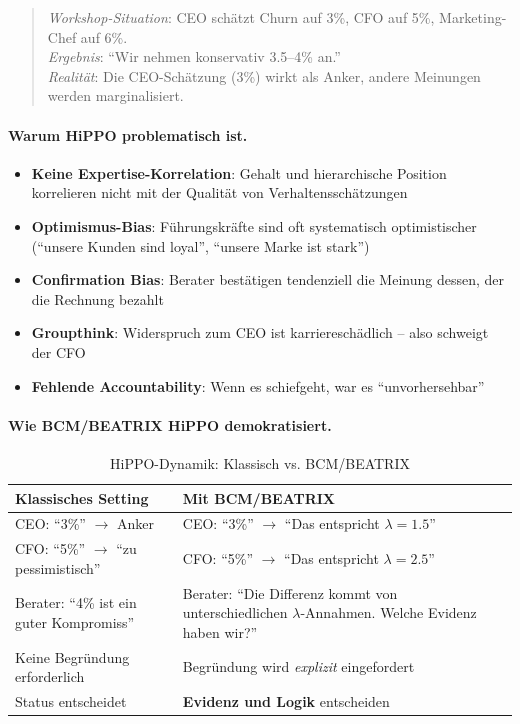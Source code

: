 \begin{quote}
\textit{Workshop-Situation}: CEO schätzt Churn auf 3\%, CFO auf 5\%, Marketing-Chef auf 6\%.\\
\textit{Ergebnis}: ``Wir nehmen konservativ 3.5--4\% an.'' \\
\textit{Realität}: Die CEO-Schätzung (3\%) wirkt als Anker, andere Meinungen werden marginalisiert.
\end{quote}

\paragraph{Warum HiPPO problematisch ist.}
\begin{itemize}
    \item \textbf{Keine Expertise-Korrelation}: Gehalt und hierarchische Position korrelieren nicht mit der Qualität von Verhaltensschätzungen
    \item \textbf{Optimismus-Bias}: Führungskräfte sind oft systematisch optimistischer (``unsere Kunden sind loyal'', ``unsere Marke ist stark'')
    \item \textbf{Confirmation Bias}: Berater bestätigen tendenziell die Meinung dessen, der die Rechnung bezahlt
    \item \textbf{Groupthink}: Widerspruch zum CEO ist karriereschädlich -- also schweigt der CFO
    \item \textbf{Fehlende Accountability}: Wenn es schiefgeht, war es ``unvorhersehbar''
\end{itemize}

\paragraph{Wie BCM/BEATRIX HiPPO demokratisiert.}

\begin{table}[h]
\centering
\caption{HiPPO-Dynamik: Klassisch vs. BCM/BEATRIX}
\begin{tabular}{@{}p{6cm}p{6.5cm}@{}}
\toprule
\textbf{Klassisches Setting} & \textbf{Mit BCM/BEATRIX} \\
\midrule
CEO: ``3\%'' $\rightarrow$ Anker & CEO: ``3\%'' $\rightarrow$ ``Das entspricht $\lambda = 1.5$'' \\[0.3em]
CFO: ``5\%'' $\rightarrow$ ``zu pessimistisch'' & CFO: ``5\%'' $\rightarrow$ ``Das entspricht $\lambda = 2.5$'' \\[0.3em]
Berater: ``4\% ist ein guter Kompromiss'' & Berater: ``Die Differenz kommt von unterschiedlichen $\lambda$-Annahmen. Welche Evidenz haben wir?'' \\[0.3em]
Keine Begründung erforderlich & Begründung wird \textit{explizit} eingefordert \\[0.3em]
Status entscheidet & \textbf{Evidenz und Logik} entscheiden \\
\bottomrule
\end{tabular}
\end{table}

